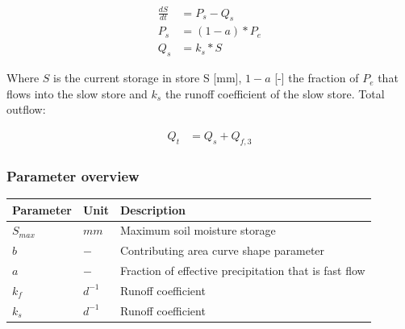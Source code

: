 \begin{align}
	\frac{dS}{dt} &= P_s - Q_s\\
	P_s &= (1-a)*P_e \\
	Q_s &= k_s*S 
\end{align}
  
\noindent Where $S$ is the current storage in store S [mm], $1-a$ [-] the fraction of $P_e$ that flows into the slow store and $k_s$ the runoff coefficient of the slow store. Total outflow:

\begin{align}
	Q_t &= Q_s + Q_{f,3}
\end{align}

\subsubsection{Parameter overview}
\begin{table}[htbp]
  \centering
    \begin{tabular}{lll}
    \toprule
    Parameter & Unit  & Description \\
    \midrule
    $S_{max}$ & $mm$  & Maximum soil moisture storage \\
    $b$   & $-$   & Contributing area curve shape parameter \\
    $a$   & $-$   & Fraction of effective precipitation that is fast flow \\
    $k_f$ & $d^{-1}$ & Runoff coefficient \\
    $k_s$ & $d^{-1}$ & Runoff coefficient \\
    \bottomrule
    \end{tabular}%
  \label{tab:addlabel}%
\end{table}%
